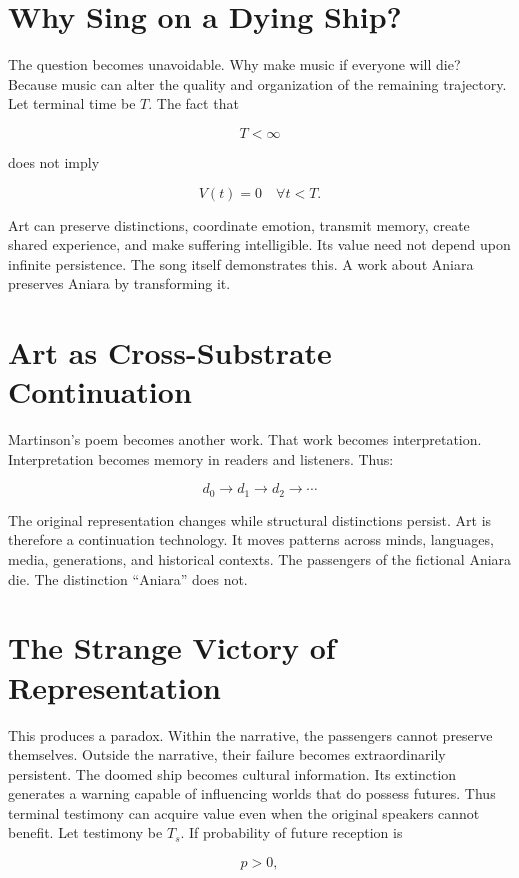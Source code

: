 \documentclass[11pt,oneside]{book}
\theoremstyle{definition}
\theoremstyle{remark}
\begin{document}
\section{Why Sing on a Dying Ship?}

The question becomes unavoidable. Why make music if everyone will die? Because music can alter the
quality and organization of the remaining trajectory. Let terminal time be \(T\). The fact that

\[
T<\infty
\]

does not imply

\[
V(t)=0 \quad \forall t<T.
\]

Art can preserve distinctions, coordinate emotion, transmit memory, create shared experience, and
make suffering intelligible. Its value need not depend upon infinite persistence. The song itself
demonstrates this. A work about Aniara preserves Aniara by transforming it.

\section{Art as Cross-Substrate Continuation}

Martinson's poem becomes another work. That work becomes interpretation. Interpretation becomes
memory in readers and listeners. Thus:

\[
d_0 \rightarrow d_1 \rightarrow d_2 \rightarrow \cdots
\]

The original representation changes while structural distinctions persist. Art is therefore a
continuation technology. It moves patterns across minds, languages, media, generations, and
historical contexts. The passengers of the fictional Aniara die. The distinction ``Aniara'' does
not.

\section{The Strange Victory of Representation}

This produces a paradox. Within the narrative, the passengers cannot preserve themselves. Outside
the narrative, their failure becomes extraordinarily persistent. The doomed ship becomes cultural
information. Its extinction generates a warning capable of influencing worlds that do possess
futures. Thus terminal testimony can acquire value even when the original speakers cannot benefit.
Let testimony be \(T_s\). If probability of future reception is

\[
p>0,
\]
\end{document}
